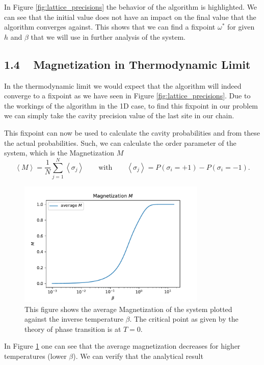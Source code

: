 \documentclass[main.tex]{subfiles}
\begin{document}
In Figure \ref{fig:lattice_precisions} the behavior of the algorithm is highlighted.
We can see that the initial value does not have an impact on the final value that the algorithm converges against.
This shows that we can find a fixpoint $\omega^{*}$ for given $h$ and $\beta$ that we will use in further analysis of the system.


\subsection*{1.4 \,\,\, Magnetization in Thermodynamic Limit}
In the thermodynamic limit we would expect that the algorithm will indeed converge to a fixpoint as we have seen in Figure \ref{fig:lattice_precisions}.
Due to the workings of the algorithm in the 1D case, to find this fixpoint in our problem we can simply take the cavity precision value of the last site in our chain.

This fixpoint can now be used to calculate the cavity probabilities and from these the actual probabilities.
Such, we can calculate the order parameter of the system, which is the Magnetization $M$  
\[
    \left<M \right> = \frac{1}{N} \sum_{j=1}^{N} \left<\sigma_j \right> \quad\quad
    \text{with} \quad\quad
    \left<\sigma_j \right> = P(\sigma_i = +1) - P(\sigma_i = -1)
.\] 

\begin{figure}[htpb]
    \centering
    \includegraphics[width=0.8\textwidth]{../figures/1_4_magnetization.pdf}
    \caption{
        This figure shows the average Magnetization of the system plotted against the inverse temperature $\beta$.
        The critical point as given by the theory of phase transition is at $T=0$.
    }
    \label{fig:magnetization}
\end{figure}

In Figure \ref{fig:magnetization} one can see that the average magnetization decreases for higher temperatures (lower $\beta$).
We can verify that the analytical result \cite{ising1925}
\end{document}

